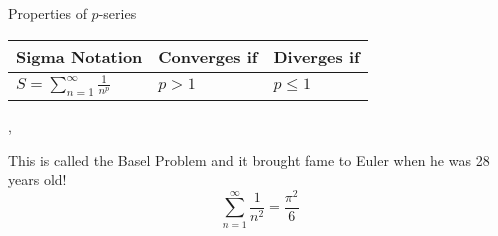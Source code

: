 	\begin{namedframe}{Properties of $p$-series}
		\begin{center}
			\begin{tabular}{l|l|l}
				Sigma Notation                                      & Converges if & Diverges if \\\hline
				$S = \displaystyle\sum_{n=1}^{\infty}\frac{1}{n^p}$ & $p>1$        & $p \leq 1$
			\end{tabular}
		\end{center}

		\sep

		This is called the Basel Problem and it brought fame to Euler when he was 28 years old!
		\[\sum_{n=1}^{\infty}\frac{1}{n^2} = \frac{\pi^2}{6}\]
	\end{namedframe}


